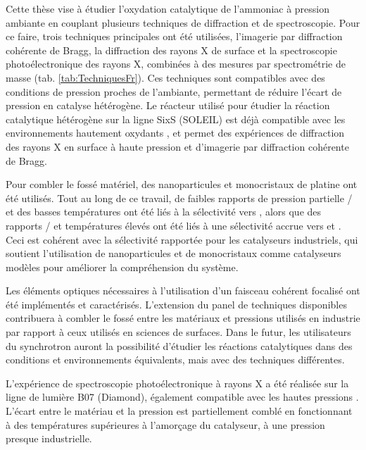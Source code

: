 Cette thèse vise à étudier l'oxydation catalytique de l'ammoniac à pression ambiante en couplant plusieurs techniques de diffraction et de spectroscopie.
Pour ce faire, trois techniques principales ont été utilisées, l'imagerie par diffraction cohérente de Bragg, la diffraction des rayons X de surface et la spectroscopie photoélectronique des rayons X, combinées à des mesures par spectrométrie de masse (tab. \ref{tab:TechniquesFr}).
Ces techniques sont compatibles avec des conditions de pression proches de l'ambiante, permettant de réduire l'écart de pression en catalyse hétérogène.
Le réacteur utilisé pour étudier la réaction catalytique hétérogène sur la ligne SixS (SOLEIL) est déjà compatible avec les environnements hautement oxydants \parencite{VanRijn2010, Resta2020a}, et permet des expériences de diffraction des rayons X en surface à haute pression et d'imagerie par diffraction cohérente de Bragg.

Pour combler le fossé matériel, des nanoparticules et monocristaux de platine ont été utilisés.
Tout au long de ce travail, de faibles rapports de pression partielle / et des basses températures ont été liés à la sélectivité vers , alors que des rapports / et températures élevés ont été liés à une sélectivité accrue vers  et .
Ceci est cohérent avec la sélectivité rapportée pour les catalyseurs industriels, qui soutient l'utilisation de nanoparticules et de monocristaux comme catalyseurs modèles pour améliorer la compréhension du système.

Les éléments optiques nécessaires à l'utilisation d'un faisceau cohérent focalisé ont été implémentés et caractérisés.
L'extension du panel de techniques disponibles contribuera à combler le fossé entre les matériaux et pressions utilisés en industrie par rapport à ceux utilisés en sciences de surfaces.
Dans le futur, les utilisateurs du synchrotron auront la possibilité d'étudier les réactions catalytiques dans des conditions et environnements équivalents, mais avec des techniques différentes.

L'expérience de spectroscopie photoélectronique à rayons X a été réalisée sur la ligne de lumière B07 (Diamond), également compatible avec les hautes pressions \parencite{Held2020}.
L'écart entre le matériau et la pression est partiellement comblé en fonctionnant à des températures supérieures à l'amorçage du catalyseur, à une pression presque industrielle.

